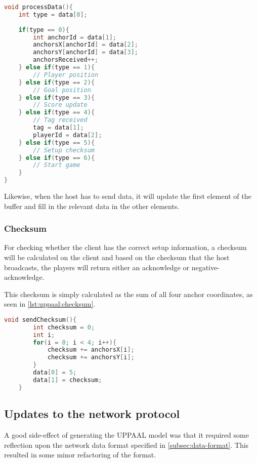\begin{lstlisting}[caption={Processing Data in UPPAAL model}, captionpos=b,language=C,label={lst:uppaal:processData}]
void processData(){
    int type = data[0];
    
    if(type == 0){
        int anchorId = data[1];
        anchorsX[anchorId] = data[2];
        anchorsY[anchorId] = data[3];
        anchorsReceived++;
    } else if(type == 1){
        // Player position
    } else if(type == 2){
        // Goal position
    } else if(type == 3){
        // Score update
    } else if(type == 4){
        // Tag received
        tag = data[1];
        playerId = data[2];
    } else if(type == 5){
        // Setup checksum
    } else if(type == 6){
        // Start game
    }
}
\end{lstlisting}

Likewise, when the host has to send data, it will update the first element of the buffer and fill in the relevant data in the other elements.

\subsubsection{Checksum}
For checking whether the client has the correct setup information, a checksum will be calculated on the client and based on the checksum that the host broadcasts, the players will return either an acknowledge or negative-acknowledge.

This checksum is simply calculated as the sum of all four anchor coordinates, as seen in \autoref{lst:uppaal:checksum}.

\begin{lstlisting}[caption={Calculating checksum in UPPAAL model}, captionpos=b,language=C,label={lst:uppaal:checksum}]
    void sendChecksum(){
        int checksum = 0;
        int i;
        for(i = 0; i < 4; i++){
            checksum += anchorsX[i];
            checksum += anchorsY[i];
        }
        data[0] = 5;
        data[1] = checksum;
    }
\end{lstlisting}

\subsection{Updates to the network protocol}
A good side-effect of generating the UPPAAL model was that it required some reflection upon the network data format specified in \autoref{subsec:data-format}.
This resulted in some minor refactoring of the format.

